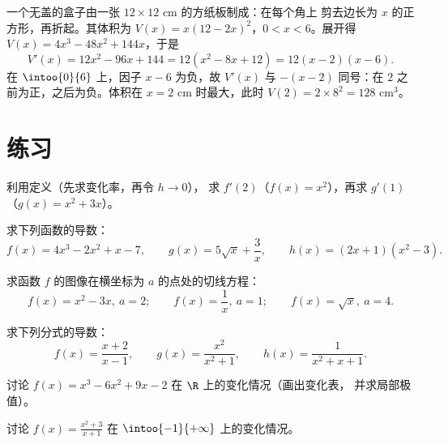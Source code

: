 \begin{example}[优化问题]\label{ex:g11:deriv:box}
一个无盖的盒子由一张 $12 \times 12$ cm 的方纸板制成：在每个角上
剪去边长为 $x$ 的正方形，再折起。其体积为
$V(x) = x(12 - 2x)^2$，$0 < x < 6$。展开得
$V(x) = 4x^3 - 48x^2 + 144x$，于是
\[
V'(x) = 12x^2 - 96x + 144 = 12(x^2 - 8x + 12) = 12(x - 2)(x - 6).
\]
在 $\intoo{0}{6}$ 上，因子 $x - 6$ 为负，故 $V'(x)$ 与
$-(x-2)$ 同号：在 $2$ 之前为正，之后为负。体积在
$x = 2$ cm 时最大，此时 $V(2) = 2 \times 8^2 = 128$ cm$^3$。
\end{example}

\section{练习}

\begin{exercise}[$\star$]\label{exo:g11:deriv:1}
利用定义（先求变化率，再令 $h \to 0$），
求 $f'(2)$（$f(x) = x^2$），再求 $g'(1)$（$g(x) = x^2 + 3x$）。
\end{exercise}

\begin{exercise}[$\star$]\label{exo:g11:deriv:2}
求下列函数的导数：
\[
f(x) = 4x^3 - 2x^2 + x - 7, \qquad
g(x) = 5\sqrt{x} + \frac{3}{x}, \qquad
h(x) = (2x+1)(x^2 - 3) .
\]
\end{exercise}

\begin{exercise}[$\star$]\label{exo:g11:deriv:3}
求函数 $f$ 的图像在横坐标为
$a$ 的点处的切线方程：
\[
f(x) = x^2 - 3x, \ a = 2; \qquad
f(x) = \frac1x, \ a = 1; \qquad
f(x) = \sqrt x, \ a = 4 .
\]
\end{exercise}

\begin{exercise}[$\star$]\label{exo:g11:deriv:4}
求下列分式的导数：
\[
f(x) = \frac{x+2}{x-1}, \qquad
g(x) = \frac{x^2}{x^2+1}, \qquad
h(x) = \frac{1}{x^2 + x + 1} .
\]
\end{exercise}

\begin{exercise}[$\star\star$]\label{exo:g11:deriv:5}
讨论 $f(x) = x^3 - 6x^2 + 9x - 2$ 在 $\R$ 上的变化情况（画出变化表，
并求局部极值）。
\end{exercise}

\begin{exercise}[$\star\star$]\label{exo:g11:deriv:6}
讨论 $f(x) = \frac{x^2 + 3}{x + 1}$ 在
$\intoo{-1}{+\infty}$ 上的变化情况。
\end{exercise}

